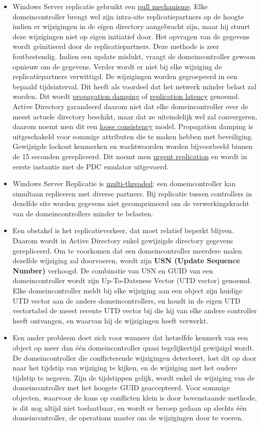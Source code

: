 \begin{enumerate}
{\begin{itemize}
				\item Windows Server replicatie gebruikt een \underline{pull mechanisme}.  Elke domeincontroller brengt wel zijn intra-site replicatiepartners op de hoogte indien er wijzigingen in de eigen directory aangebracht zijn, maar hij stuurt deze wijzigingen niet op eigen initiatief door. Het opvragen van de gegevens wordt geïnitieerd door de replicatiepartners. Deze methode is zeer foutbestendig. Indien een update mislukt, vraagt de domeincontroller gewoon opnieuw om de gegevens. Verder wordt er niet bij elke wijziging de replicatiepartners verwittigd. De wijzigingen worden gegroepeerd in een bepaald tijdsinterval. Dit heeft als voordeel dat het netwerk minder belast zal worden. Dit wordt \underline{propagation damping} of \underline{replication latency} genoemd. Active Directory garandeerd daarom niet dat elke domeincontroller over de meest actuele directory beschikt, maar dat ze uiteindelijk wel zal convergeren, daarom noemt men dit een \underline{loose consistency} model. Propagation damping is uitgeschakeld voor sommige attributen die te maken hebben met beveiliging. Gewijzigde lockout kenmerken en wachtwoorden worden bijvoorbeeld binnen de 15 seconden gerepliceerd. Dit noemt men \underline{urgent replication} en wordt in eerste instantie met de PDC emulator uitgevoerd. 
				\item Windows Server Replicatie is \underline{multi-threaded}: een domeincontroller kan simultaan repliceren met diverse partners. Bij replicatie tussen controllers in dezelfde site worden gegevens niet gecomprimeerd om de verwerkingskracht van de domeincontrollers minder te belasten. 
				\item Een obstakel is het replicatieverkeer, dat moet relatief beperkt blijven. Daarom wordt in Active Directory enkel gewijzigde directory gegevens gerepliceerd. Om te voorkomen dat een domeincontroller meerdere malen dezelfde wijziging zal doorvoeren, wordt zijn \textbf{USN (Update Sequence Number)} verhoogd. De combinatie van USN en GUID van een domeincontroller wordt zijn Up-To-Dateness Vector (UTD vector) genoemd. Elke domeincontroller meldt bij elke wijziging aan een object zijn huidige UTD vector aan de andere domeincontrollers, en houdt in de eigen UTD vectortabel de meest recente UTD vector bij die hij van elke andere controller heeft ontvangen, en waarvan hij de wijzigingen heeft verwerkt.
				\item Een ander probleem doet zich voor wanneer dat hetzelfde kenmerk van een object op meer dan één domeincontroller quasi tegelijkertijd gewijzigd wordt. De domeincontroller die conflicterende wijzigingen detecteert, lost dit op door naar het tijdstip van wijziging te kijken, en de wijziging met het oudere tijdstip te negeren. Zijn de tijdstippen gelijk, wordt enkel de wijziging van de domeincontroller met het hoogste GUID geaccepteerd. Voor sommige objecten, waarvoor de kans op conflicten klein is door bovenstaande methode, is dit nog altijd niet toelaatbaar, en wordt er beroep gedaan op slechts één domeincontroller, de operations master om de wijzigingen door te voeren.

\end{itemize}}
\end{enumerate}
